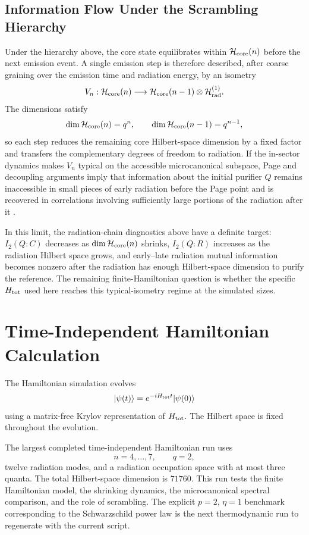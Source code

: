 \documentclass[12pt]{article}
\newcommand{\Hcore}{\mathcal H_{\rm core}}
\newcommand{\Hrad}{\mathcal H_{\rm rad}}
\newcommand{\ket}[1]{|#1\rangle}
\begin{document}
\subsection{Information Flow Under the Scrambling Hierarchy}

Under the hierarchy above, the core state equilibrates within $\Hcore(n)$
before the next emission event.  A single emission step is therefore
described, after coarse graining over the emission time and radiation energy,
by an isometry
\begin{equation}
    V_n:\Hcore(n)\longrightarrow
    \Hcore(n-1)\otimes \Hrad^{(1)} .
\end{equation}
The dimensions satisfy
\begin{equation}
    \dim\Hcore(n)=q^n,
    \qquad
    \dim\Hcore(n-1)=q^{n-1},
\end{equation}
so each step reduces the remaining core Hilbert-space dimension by a fixed
factor and transfers the complementary degrees of freedom to radiation.  If
the in-sector dynamics makes $V_n$ typical on the accessible microcanonical
subspace, Page and decoupling arguments imply that information about the
initial purifier $Q$ remains inaccessible in small pieces of early radiation
before the Page point and is recovered in correlations involving sufficiently
large portions of the radiation after it \cite{Page1993Info,Page1993Average,HaydenPreskill2007}.

In this limit, the radiation-chain diagnostics above have a definite target:
$I_2(Q:C)$ decreases as $\dim\Hcore(n)$ shrinks, $I_2(Q:R)$ increases as the
radiation Hilbert space grows, and early--late radiation mutual information
becomes nonzero after the radiation has enough Hilbert-space dimension to
purify the reference.  The remaining finite-Hamiltonian question is whether
the specific $H_{\rm tot}$ used here reaches this typical-isometry regime at
the simulated sizes.

\section{Time-Independent Hamiltonian Calculation}

The Hamiltonian simulation evolves
\begin{equation}
    \ket{\psi(t)}=e^{-iH_{\rm tot}t}\ket{\psi(0)}
\end{equation}
using a matrix-free Krylov representation of $H_{\rm tot}$.  The Hilbert space
is fixed throughout the evolution.

The largest completed time-independent Hamiltonian run uses
\begin{equation}
    n=4,\ldots,7,\qquad q=2,
\end{equation}
twelve radiation modes, and a radiation occupation space with at most three
quanta.  The total Hilbert-space dimension is $71760$.
This run tests the finite Hamiltonian model, the shrinking dynamics, the
microcanonical spectral comparison, and the role of scrambling.  The explicit
$p=2$, $\eta=1$ benchmark corresponding to the Schwarzschild power law is
the next thermodynamic run to regenerate with the current script.
\end{document}
